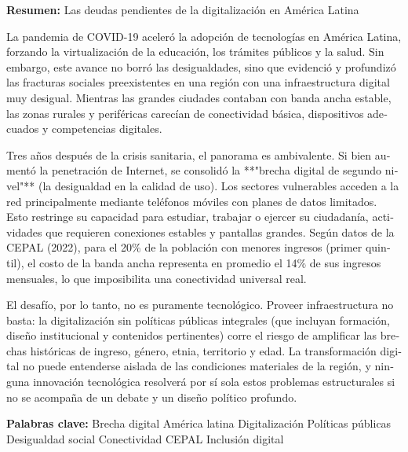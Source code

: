 \documentclass{article}
\begin{document}
\begin{tcolorbox}[colback=brown!8!white,colframe=brown!8!white,boxrule=0pt,arc=2pt,left=4pt,right=4pt,top=3pt,bottom=3pt,before skip=4pt,after skip=4pt]
\begin{otherlanguage}{spanish}
\sffamily\small \textbf{Resumen:} Las deudas pendientes de la digitalización en América Latina

La pandemia de COVID-19 aceleró la adopción de tecnologías en América Latina, forzando la virtualización de la educación, los trámites públicos y la salud. Sin embargo, este avance no borró las desigualdades, sino que evidenció y profundizó las fracturas sociales preexistentes en una región con una infraestructura digital muy desigual. Mientras las grandes ciudades contaban con banda ancha estable, las zonas rurales y periféricas carecían de conectividad básica, dispositivos adecuados y competencias digitales.

Tres años después de la crisis sanitaria, el panorama es ambivalente. Si bien aumentó la penetración de Internet, se consolidó la **"brecha digital de segundo nivel"** (la desigualdad en la calidad de uso). Los sectores vulnerables acceden a la red principalmente mediante teléfonos móviles con planes de datos limitados. Esto restringe su capacidad para estudiar, trabajar o ejercer su ciudadanía, actividades que requieren conexiones estables y pantallas grandes. Según datos de la CEPAL (2022), para el 20\% de la población con menores ingresos (primer quintil), el costo de la banda ancha representa en promedio el 14\% de sus ingresos mensuales, lo que imposibilita una conectividad universal real.

El desafío, por lo tanto, no es puramente tecnológico. Proveer infraestructura no basta: la digitalización sin políticas públicas integrales (que incluyan formación, diseño institucional y contenidos pertinentes) corre el riesgo de amplificar las brechas históricas de ingreso, género, etnia, territorio y edad. La transformación digital no puede entenderse aislada de las condiciones materiales de la región, y ninguna innovación tecnológica resolverá por sí sola estos problemas estructurales si no se acompaña de un debate y un diseño político profundo.
\par\smallskip\noindent\textbf{Palabras clave:} Brecha digital América latina Digitalización Políticas públicas Desigualdad social Conectividad CEPAL Inclusión digital
\end{otherlanguage}
\end{tcolorbox}
\end{document}
